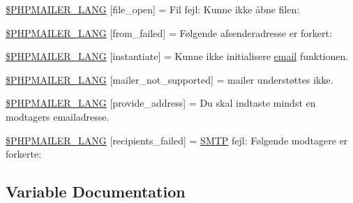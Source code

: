 \begin{DoxyCompactItemize}
\item 
\hyperlink{phpmailer_8lang-dk_8php_a28d1a6517bf4c942a0ddd506188ad2e0}{\$\+P\+H\+P\+M\+A\+I\+L\+E\+R\+\_\+\+L\+A\+NG} \mbox{[}\textquotesingle{}file\+\_\+open\textquotesingle{}\mbox{]} = \textquotesingle{}Fil fejl\+: Kunne ikke åbne filen\+: \textquotesingle{}
\item 
\hyperlink{phpmailer_8lang-dk_8php_adf832ae12155a09be077c6d5e4fd7e22}{\$\+P\+H\+P\+M\+A\+I\+L\+E\+R\+\_\+\+L\+A\+NG} \mbox{[}\textquotesingle{}from\+\_\+failed\textquotesingle{}\mbox{]} = \textquotesingle{}Følgende afsenderadresse er forkert\+: \textquotesingle{}
\item 
\hyperlink{phpmailer_8lang-dk_8php_ad58dde16780f4770ccf4dd282ea1f5ad}{\$\+P\+H\+P\+M\+A\+I\+L\+E\+R\+\_\+\+L\+A\+NG} \mbox{[}\textquotesingle{}instantiate\textquotesingle{}\mbox{]} = \textquotesingle{}Kunne ikke initialisere \hyperlink{actions_2account_8php_a011c66ae212438e0d7de7c0e40451bb3}{email} funktionen.\textquotesingle{}
\item 
\hyperlink{phpmailer_8lang-dk_8php_aa2ebcb8833ee83a7ad67401c4bb3a6ad}{\$\+P\+H\+P\+M\+A\+I\+L\+E\+R\+\_\+\+L\+A\+NG} \mbox{[}\textquotesingle{}mailer\+\_\+not\+\_\+supported\textquotesingle{}\mbox{]} = \textquotesingle{} mailer understøttes ikke.\textquotesingle{}
\item 
\hyperlink{phpmailer_8lang-dk_8php_a8b97897c2406b7392b056f375feeefbb}{\$\+P\+H\+P\+M\+A\+I\+L\+E\+R\+\_\+\+L\+A\+NG} \mbox{[}\textquotesingle{}provide\+\_\+address\textquotesingle{}\mbox{]} = \textquotesingle{}Du skal indtaste mindst en modtagers emailadresse.\textquotesingle{}
\item 
\hyperlink{phpmailer_8lang-dk_8php_a7589d30bb9b368327c2df015f3e6bcba}{\$\+P\+H\+P\+M\+A\+I\+L\+E\+R\+\_\+\+L\+A\+NG} \mbox{[}\textquotesingle{}recipients\+\_\+failed\textquotesingle{}\mbox{]} = \textquotesingle{}\hyperlink{class_s_m_t_p}{S\+M\+TP} fejl\+: Følgende modtagere er forkerte\+: \textquotesingle{}
\end{DoxyCompactItemize}


\subsection{Variable Documentation}
